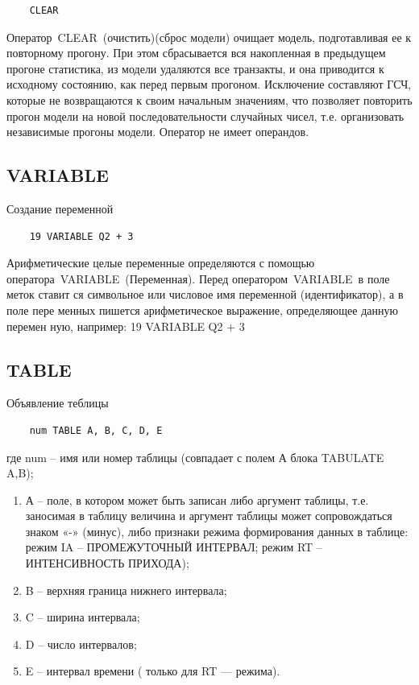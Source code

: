 \documentclass[14pt]{extarticle}
\begin{document}
\begin{lstlisting}
	CLEAR
\end{lstlisting}

Оператор CLEAR (очистить)(сброс модели) очищает модель, подготавливая ее к повторному прогону. При этом сбрасывается вся накопленная в предыдущем прогоне статистика, из модели удаляются все транзакты, и она приводится к исходному состоянию, как перед первым прогоном. Исключение составляют ГСЧ, которые не возвращаются к своим начальным значениям, что позволяет повторить прогон модели на новой последовательности случайных чисел, т.е. организовать независимые прогоны модели. Оператор не имеет операндов.


\subsection*{VARIABLE}

Создание переменной

\begin{lstlisting}
	19 VARIABLE Q2 + 3
\end{lstlisting}

Арифметические целые переменные определяются с помощью оператора VARIABLE (Переменная). Перед оператором VARIABLE в поле меток ставит ся символьное или числовое имя переменной (идентификатор), а в поле пере менных пишется арифметическое выражение, определяющее данную перемен ную, например: 
19 VARIABLE Q2 + 3

\subsection*{TABLE}

Объявление теблицы

\begin{lstlisting}
	num TABLE A, B, C, D, E
\end{lstlisting}

где num – имя или номер таблицы (совпадает с полем А блока TABULATE A,B);

\begin{enumerate}
	\item А – поле, в котором может быть записан либо аргумент таблицы, т.е. заносимая в таблицу величина и аргумент таблицы может сопровождаться знаком «-» (минус), либо признаки режима формирования данных в таблице: режим IA – ПРОМЕЖУТОЧНЫЙ ИНТЕРВАЛ; режим RT – ИНТЕНСИВНОСТЬ ПРИХОДА);
	\item B – верхняя граница нижнего интервала;
	\item C – ширина интервала;
	\item D – число интервалов;
	\item E – интервал времени ( только для RT — режима).
\end{enumerate}
\end{document}
